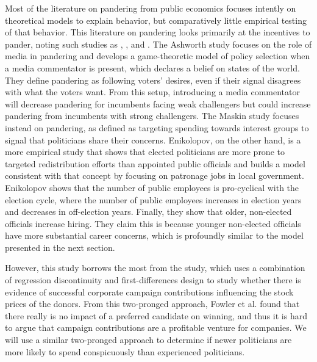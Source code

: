 Most of the literature on pandering from public economics focuses intently on theoretical models to explain behavior, but comparatively little empirical testing of that behavior. 
This literature on pandering looks primarily at the incentives to pander, noting such studies as \cite{ASHWORTH2010838}, \cite{MASKIN201979},  and \cite{ENIKOLOPOV201474}. 
The Ashworth study focuses on the role of media in pandering and develops a game-theoretic model of policy selection when a media commentator is present, which declares a belief on states of the world. 
They define pandering as following voters' desires, even if their signal disagrees with what the voters want. 
From this setup, introducing a media commentator will decrease pandering for incumbents facing weak challengers but could increase pandering from incumbents with strong challengers. 
The Maskin study focuses instead on pandering, as defined as targeting spending towards interest groups to signal that politicians share their concerns. 
Enikolopov, on the other hand, is a more empirical study that shows that elected politicians are more prone to targeted redistribution efforts than appointed public officials and builds a model consistent with that concept by focusing on patronage jobs in local government. 
Enikolopov shows that the number of public employees is pro-cyclical with the election cycle, where the number of public employees increases in election years and decreases in off-election years. 
Finally, they show that older, non-elected officials increase hiring. 
They claim this is because younger non-elected officials have more substantial career concerns, which is profoundly similar to the model presented in the next section. 

However, this study borrows the most from the \cite{fowleretalquidproquo} study, which uses a combination of regression discontinuity and first-differences design to study whether there is evidence of successful corporate campaign contributions influencing the stock prices of the donors. 
From this two-pronged approach, Fowler et al. found that there really is no impact of a preferred candidate on winning, and thus it is hard to argue that campaign contributions are a profitable venture for companies. 
We will use a similar two-pronged approach to determine if newer politicians are more likely to spend conspicuously than experienced politicians. 